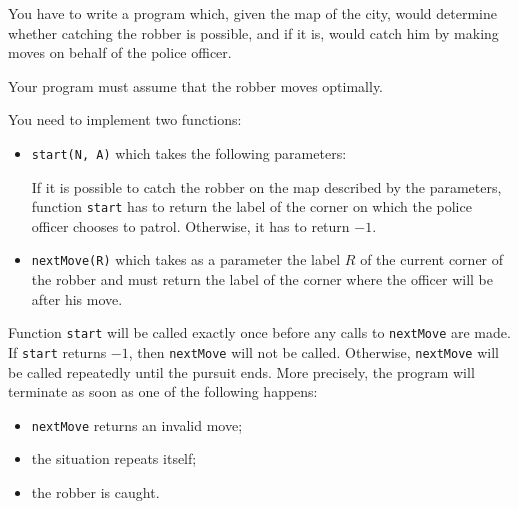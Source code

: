 \documentclass{boi2014}
\newcommand{\method}[1]{{\tt #1}}
\begin{document}
    \Task
    You have to write a program which, given the map of the city,
    would determine whether catching the robber is possible, and if it is,
    would catch him by making moves on behalf of the police officer.

    Your program must assume that the robber moves optimally.

    \Implementation
    You need to implement two functions:
    \begin{itemize}
        \item \method{start(N, A)} which takes the following parameters:

        If it is possible to catch the robber on the map described
        by the parameters, function \method{start} has to return the
        label of the corner on which the police officer chooses to patrol.
        Otherwise, it has to return $-1$.

        \item \method{nextMove(R)} which takes as a
            parameter the label $R$ of the current corner of the robber
            and must return the label of the corner where the officer
            will be after his move.
    \end{itemize}

    Function \method{start} will be called exactly once before any
    calls to \method{nextMove} are made. If \method{start} returns
    $-1$, then \method{nextMove} will not be called. Otherwise,
    \method{nextMove} will be called repeatedly until the pursuit ends.
    More precisely, the program will terminate as soon as one of the
    following happens:
    \begin{itemize}
        \item \method{nextMove} returns an invalid move;
        \item the situation repeats itself;
        \item the robber is caught.
    \end{itemize}
\end{document}
